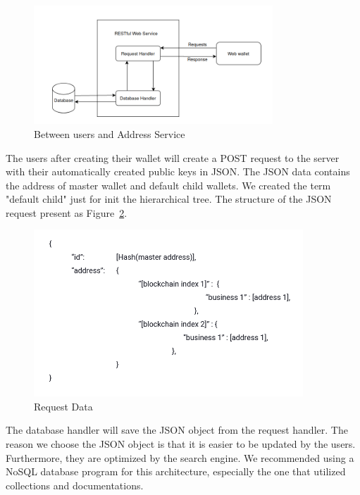 \begin{figure}[!ht]
    \centering
    \includegraphics[width=0.8\textwidth]{images/design_uas.png}
    \caption[Between users and Address Service]{Between users and Address Service}
    \label{fig:uas}
\end{figure}

The users after creating their wallet will create a POST request to the server with their automatically created public keys in JSON.
The JSON data contains the address of master wallet and default child wallets.
We created the term "default child" just for init the hierarchical tree.
The structure of the JSON request present as Figure~\ref{fig:json}.

\begin{figure}[!ht]
    \centering
    \includegraphics[width=0.9\textwidth]{images/design_json.png}
    \caption[Request Data]{Request Data}
    \label{fig:json}
\end{figure}

The database handler will save the JSON object from the request handler. The reason we choose the JSON object is that it is easier to be updated by the users. Furthermore, they are optimized by the search engine. We recommended using a NoSQL database program for this architecture, especially the one that utilized collections and documentations.

